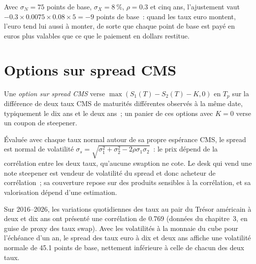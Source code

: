 \begin{example}\label{ex:rc:convexity-adjustments-and-constant-maturity-products:quanto}
Avec $\sigma_N = 75$ points de base, $\sigma_X = 8~\%$, $\rho = 0.3$ et cinq ans,
l'ajustement vaut $-0.3\times0.0075\times0.08\times5 = -9$ points de base~: quand les
taux euro montent, l'euro tend lui aussi à monter, de sorte que chaque point de base est
payé en euros plus valables que ce que le paiement en dollars restitue.
\end{example}

\section{Options sur spread CMS}

\begin{definition}\label{def:rc:convexity-adjustments-and-constant-maturity-products:spread}
Une \emph{option sur spread CMS} verse $\max(S_1(T)-S_2(T)-K,0)$
en $T_p$ sur la différence de deux taux CMS de maturités différentes observés à la
même date, typiquement le dix ans et le deux ans~; un panier de ces options avec
$K=0$ verse un coupon de steepener.
\end{definition}

Évaluée avec chaque taux normal autour de sa propre espérance CMS, le spread est
normal de volatilité $\sigma_s = \sqrt{\sigma_1^2+\sigma_2^2-2\rho\sigma_1\sigma_2}$~:
le prix dépend de la corrélation entre les deux taux, qu'aucune swaption ne cote. Le
desk qui vend une note steepener est vendeur de volatilité du spread et donc acheteur de
corrélation~; sa couverture repose sur des produits sensibles à la corrélation, et sa
valorisation dépend d'une estimation.

\begin{example}\label{ex:rc:convexity-adjustments-and-constant-maturity-products:spreadvol}
Sur 2016--2026, les variations quotidiennes des taux au pair du Trésor américain à deux et dix ans
ont présenté une corrélation de 0.769 (données du chapitre~3, en guise de proxy des taux swap). Avec les
volatilités à la monnaie du cube pour l'échéance d'un an, le spread des
taux euro à dix et deux ans affiche une volatilité normale de 45.1 points de base, nettement
inférieure à celle de chacun des deux taux.
\end{example}

